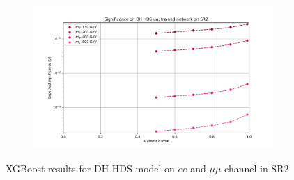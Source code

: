 \documentclass[12pt, a4paper]{book}
\begin{document}
\begin{figure}[!ht]
\begin{subfigure}[b]{0.49\textwidth}
   \end{subfigure}
   \hfill
   \begin{subfigure}[b]{0.49\textwidth}
      \centering
      \includegraphics[width=1\textwidth]{XGBoost/Model_independent/100-150/DH_HDS/EXP_SIG_uu.pdf}
   \end{subfigure}
   \caption{XGBoost results for DH HDS model on $ee$ and $\mu\mu$ channel in SR2}\label{fig:DH_HDS_SR2}
\end{figure}
\end{document}
